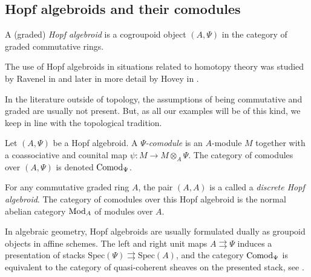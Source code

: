 

\subsection{Hopf algebroids and their comodules}
\label{ch0:ssec:hopf-algebroids-and-their-comodules}



\begin{definition}
    \label{ch0:def:hopf-algebroid}
    A (graded) \emph{Hopf algebroid} is a cogroupoid object $(A, \Psi)$ in the category of graded commutative rings. 
\end{definition}

The use of Hopf algebroids in situations related to homotopy theory was studied by Ravenel in \cite[A.1]{ravenel_86} and later in more detail by Hovey in \cite{hovey_04}. 

\begin{remark}
    In the literature outside of topology, the assumptions of being commutative and graded are usually not present. But, as all our examples will be of this kind, we keep in line with the topological tradition. 
\end{remark}

\begin{definition}
    \label{ch0:def:comodule-over-hopf-algebroid}
    Let $(A, \Psi)$ be a Hopf algebroid. A \emph{$\Psi$-comodule} is an $A$-module $M$ together with a coassociative and counital map $\psi\colon M\longrightarrow M\otimes_A \Psi$. The category of comodules over $(A, \Psi)$ is denoted \emph{$\mathrm{Comod}_\Psi$}. 
\end{definition}

\begin{example}
    \label{ch0:ex:modules-as-discrete-Hopf-algebroids}
    For any commutative graded ring $A$, the pair $(A, A)$ is a called a \emph{discrete Hopf algebroid}. The category of comodules over this Hopf algebroid is the normal abelian category $\mathrm{Mod}_A$ of modules over $A$. 
\end{example}

\begin{remark}
    \label{ch0:rm:presenting-stacks}
    In algebraic geometry, Hopf algebroids are usually formulated dually as groupoid objects in affine schemes. The left and right unit maps $A\rightrightarrows \Psi$ induces a presentation of stacks $\mathrm{Spec}(\Psi)\rightrightarrows \mathrm{Spec}(A)$, and the category $\mathrm{Comod}_\Psi$ is equivalent to the category of quasi-coherent sheaves on the presented stack, see \cite[Thm 8]{naumann_07}. 
\end{remark}


